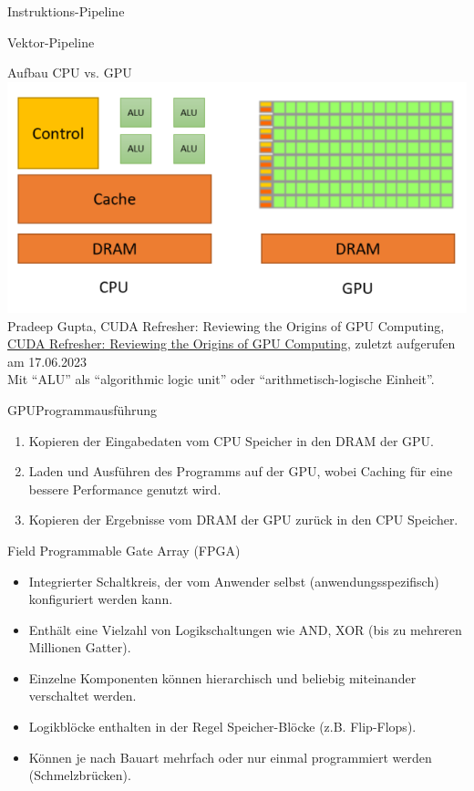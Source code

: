 \begin{defi}{Instruktions-Pipeline}

\end{defi}

\begin{defi}{Vektor-Pipeline}

\end{defi}

\begin{defi}{Aufbau CPU vs. GPU}
    \includegraphics[width=\textwidth]{images/CPUvsGPU.png}
    Pradeep Gupta, CUDA Refresher: Reviewing the Origins of GPU Computing,
    \url{CUDA Refresher: Reviewing the Origins of GPU Computing},
    zuletzt aufgerufen am 17.06.2023 \\
    Mit \enquote{ALU} als \enquote{algorithmic logic unit} oder \enquote{arithmetisch-logische Einheit}.
\end{defi}

\begin{defi}{GPU}{Programmausführung}
    \begin{enumerate}
        \item Kopieren der Eingabedaten vom CPU Speicher in den DRAM der GPU.
        \item Laden und Ausführen des Programms auf der GPU, wobei Caching für eine bessere Performance genutzt wird.
        \item Kopieren der Ergebnisse vom DRAM der GPU zurück in den CPU Speicher.
    \end{enumerate}
\end{defi}

\begin{defi}{Field Programmable Gate Array (FPGA)}
    \begin{itemize}
        \item Integrierter Schaltkreis, der vom Anwender selbst (anwendungsspezifisch) konfiguriert werden kann.
        \item Enthält eine Vielzahl von Logikschaltungen wie AND, XOR (bis zu mehreren Millionen Gatter).
        \item Einzelne Komponenten können hierarchisch und beliebig miteinander verschaltet werden.
        \item Logikblöcke enthalten in der Regel Speicher-Blöcke (z.B. Flip-Flops).
        \item Können je nach Bauart mehrfach oder nur einmal programmiert werden (Schmelzbrücken).
    \end{itemize}
\end{defi}

